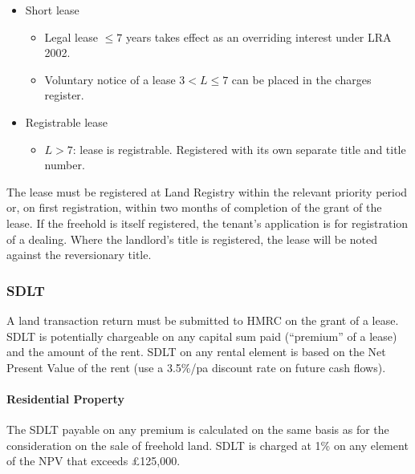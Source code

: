 \documentclass[
]{article}
\providecommand{\tightlist}{%
  \setlength{\itemsep}{0pt}\setlength{\parskip}{0pt}}
\begin{document}
\begin{itemize}
\tightlist
\item
  Short lease

  \begin{itemize}
  \tightlist
  \item
    Legal lease {\(\leq 7\)} years takes effect as an overriding
    interest under LRA 2002.
  \item
    Voluntary notice of a lease {\(3 < L \leq 7\)} can be placed in the
    charges register.
  \end{itemize}
\item
  Registrable lease

  \begin{itemize}
  \tightlist
  \item
    {\(L > 7\)}: lease is registrable. Registered with its own separate
    title and title number.
  \end{itemize}
\end{itemize}

The lease must be registered at Land Registry within the relevant
priority period or, on first registration, within two months of
completion of the grant of the lease. If the freehold is itself
registered, the tenant's application is for registration of a dealing.
Where the landlord's title is registered, the lease will be noted
against the reversionary title.

\hypertarget{sdlt}{%
\subsubsection{SDLT}\label{sdlt}}

A land transaction return must be submitted to HMRC on the grant of a
lease. SDLT is potentially chargeable on any capital sum paid
(``premium'' of a lease) and the amount of the rent. SDLT on any rental
element is based on the Net Present Value of the rent (use a 3.5\%/pa
discount rate on future cash flows).

\hypertarget{residential-property}{%
\paragraph{Residential Property}\label{residential-property}}

The SDLT payable on any premium is calculated on the same basis as for
the consideration on the sale of freehold land. SDLT is charged at 1\%
on any element of the NPV that exceeds £125,000.
\end{document}
